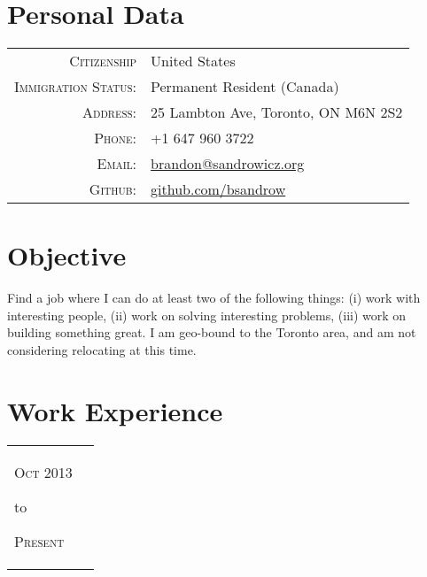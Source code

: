 {{{{{{    %
    {%
        \section{Personal Data}
        \begin{tabular}{ r l }
        \textsc{Citizenship}                    & United States\\
        \textsc{Immigration Status:}            & Permanent Resident (Canada)\\
        \textsc{Address:}                       & 25 Lambton Ave, Toronto, ON M6N 2S2\\
        \textsc{Phone:}                         & +1 647 960 3722\\
        \textsc{Email:}                         & \href{mailto:brandon@sandrowicz.org}{brandon@sandrowicz.org}\\
        \textsc{Github:}                        & \href{http://github.com/bsandrow}{github.com/bsandrow}\\
        \end{tabular}
    {%

    {%
        \section{Objective}
        Find a job where I can do at least two of the following things: (i) work with
        interesting people, (ii) work on solving interesting problems, (iii) work on
        building something great. I am geo-bound to the Toronto area, and am
        not considering relocating at this time.
    {%

    {%
        \section{Work Experience}
        \begin{tabular}{ R{1.5cm} | p{10.5cm} }
            \hfill \textsc{Oct 2013}\newline
            \begin{center} to \end{center}
            \hfill \textsc{Present} &


\end{tabular}}}}}}}}}}}}
